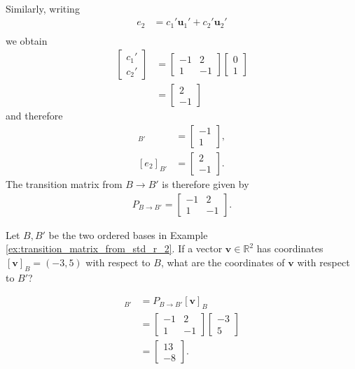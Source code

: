 \documentclass[12pt,letterpaper,reqno]{article}
\numberwithin{equation}{section}
\newcommand{\R}{\ensuremath{\mathbb R}}
\newcommand{\bv}{\mathbf{v}}
\newcommand{\bu}{\mathbf{u}}
\begin{document}
\begin{example}
\begin{align*}
\end{align*}
Similarly, writing
\begin{align*}
	e_2&=c_1'\bu_1'+c_2'\bu_2' \\
\end{align*}
we obtain
\begin{align*}
	\begin{bmatrix}
		c_1' \\ c_2'
	\end{bmatrix}&=\begin{bmatrix}
	-1 & 2 \\ 1 & -1
\end{bmatrix}\begin{bmatrix}
	0 \\ 1
\end{bmatrix} \\
&=\begin{bmatrix}
	2 \\ -1
\end{bmatrix}
\end{align*}
and therefore
\begin{align*}
	[e_1]_{B'}&=\begin{bmatrix}
		-1 \\ 1
	\end{bmatrix}, \\
	[e_2]_{B'}&=\begin{bmatrix}
		2 \\ -1
	\end{bmatrix}.	
\end{align*}
The transition matrix from $B \to B'$ is therefore given by
\begin{align*}
	P_{B \to B'}=\begin{bmatrix}
		-1 & 2 \\
		1 & -1
	\end{bmatrix}.
\end{align*}
\end{example}

\begin{exercise}
	Let $B,B'$ be the two ordered bases in Example \ref{ex:transition_matrix_from_std_r_2}. If a vector $\bv \in \R^2$ has coordinates $[\bv]_B=(-3,5)$ with respect to $B$, what are the coordinates of $\bv$ with respect to $B'$?
\end{exercise}

{\color{red}
\begin{solution}
\begin{align*}
	[\bv]_{B'}&=P_{B \to B'}[\bv]_B \\
&=\begin{bmatrix}
	-1 & 2 \\
	1 & -1
\end{bmatrix}\begin{bmatrix}
	-3 \\ 5
\end{bmatrix} \\
&=\begin{bmatrix}
	13 \\ -8
\end{bmatrix}.
\end{align*}	
\end{solution}}
\end{document}
